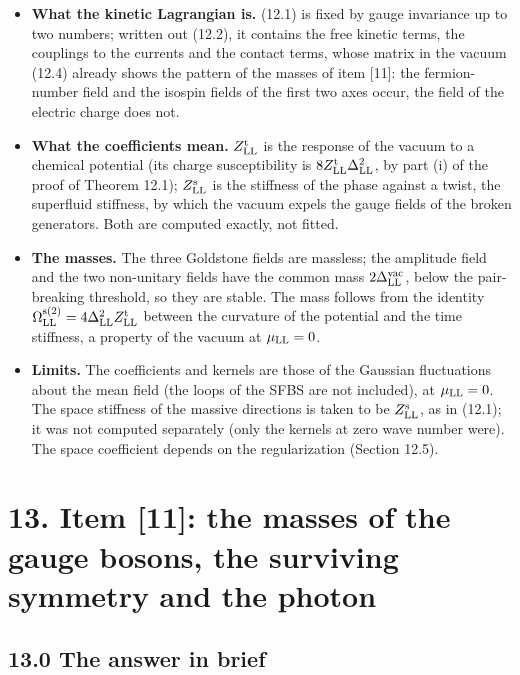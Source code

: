 \documentclass[
  10pt,
]{article}
\providecommand{\tightlist}{%
  \setlength{\itemsep}{0pt}\setlength{\parskip}{0pt}}
\begin{document}
\begin{itemize}
\tightlist
\item
  \textbf{What the kinetic Lagrangian is.} (12.1) is fixed by gauge
  invariance up to two numbers; written out (12.2), it contains the free
  kinetic terms, the couplings to the currents and the contact terms,
  whose matrix in the vacuum (12.4) already shows the pattern of the
  masses of item {[}11{]}: the fermion-number field and the isospin
  fields of the first two axes occur, the field of the electric charge
  does not.
\item
  \textbf{What the coefficients mean.} \(Z^{\rm t}_{\rm LL}\) is the
  response of the vacuum to a chemical potential (its charge
  susceptibility is \(8Z^{\rm t}_{\rm LL}\Delta_{\rm LL}^2\), by part
  (i) of the proof of Theorem 12.1); \(Z^{\rm s}_{\rm LL}\) is the
  stiffness of the phase against a twist, the superfluid stiffness, by
  which the vacuum expels the gauge fields of the broken generators.
  Both are computed exactly, not fitted.
\item
  \textbf{The masses.} The three Goldstone fields are massless; the
  amplitude field and the two non-unitary fields have the common mass
  \(2\Delta^{\rm vac}_{\rm LL}\), below the pair-breaking threshold, so
  they are stable. The mass follows from the identity
  \(\Omega^{\rm s(2)}_{\rm LL}=4\Delta_{\rm LL}^2Z^{\rm t}_{\rm LL}\)
  between the curvature of the potential and the time stiffness, a
  property of the vacuum at \(\mu_{\rm LL}=0\).
\item
  \textbf{Limits.} The coefficients and kernels are those of the
  Gaussian fluctuations about the mean field (the loops of the SFBS are
  not included), at \(\mu_{\rm LL}=0\). The space stiffness of the
  massive directions is taken to be \(Z^{\rm s}_{\rm LL}\), as in
  (12.1); it was not computed separately (only the kernels at zero wave
  number were). The space coefficient depends on the regularization
  (Section 12.5).
\end{itemize}

\hypertarget{item-11-the-masses-of-the-gauge-bosons-the-surviving-symmetry-and-the-photon}{%
\section{13. Item {[}11{]}: the masses of the gauge bosons, the
surviving symmetry and the
photon}\label{item-11-the-masses-of-the-gauge-bosons-the-surviving-symmetry-and-the-photon}}

\hypertarget{the-answer-in-brief-11}{%
\subsection{13.0 The answer in brief}\label{the-answer-in-brief-11}}
\end{document}
